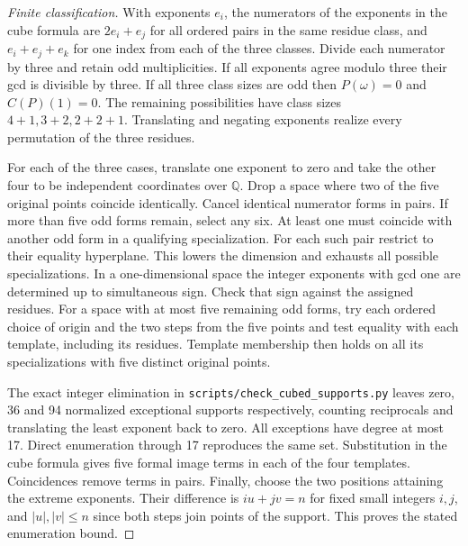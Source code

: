 \documentclass[11pt]{article}
\begin{document}
\begin{proof}[Finite classification]
With exponents \(e_i\), the numerators of the exponents in the cube
formula are \(2e_i+e_j\) for all ordered pairs in the same residue
class, and \(e_i+e_j+e_k\) for one index from each of the three
classes. Divide each numerator by three and retain odd multiplicities.
If all exponents agree modulo three their gcd is divisible by three.
If all three class sizes are odd then \(P(\omega)=0\) and
\(C(P)(1)=0\). The remaining possibilities have class sizes
\(4+1,3+2,2+2+1\). Translating and negating exponents realize every
permutation of the three residues.

For each of the three cases, translate one exponent to zero and take the
other four to be independent coordinates over \(\mathbb Q\). Drop a
space where two of the five original points coincide identically.
Cancel identical numerator forms in pairs. If more than five odd forms
remain, select any six. At least one must coincide with another odd
form in a qualifying specialization. For each such pair restrict to
their equality hyperplane. This lowers the dimension and exhausts all
possible specializations. In a one-dimensional space the integer
exponents with gcd one are determined up to simultaneous sign. Check
that sign against the assigned residues. For a space with at most five
remaining odd forms, try each ordered choice of origin and the two
steps from the five points and test equality with each template,
including its residues. Template membership then holds on all its
specializations with five distinct original points.

The exact integer elimination in \nolinkurl{scripts/check_cubed_supports.py}
leaves zero, 36 and 94 normalized exceptional supports respectively,
counting reciprocals and translating the least exponent back to zero.
All exceptions have degree at most 17. Direct enumeration through 17
reproduces the same set. Substitution in the cube formula gives five
formal image terms in each of the four templates. Coincidences remove
terms in pairs. Finally, choose the two positions attaining the extreme
exponents. Their difference is \(i u+j v=n\) for fixed small integers
\(i,j\), and \(|u|,|v|\le n\) since both steps join points of the
support. This proves the stated enumeration bound.
\end{proof}
\end{document}
